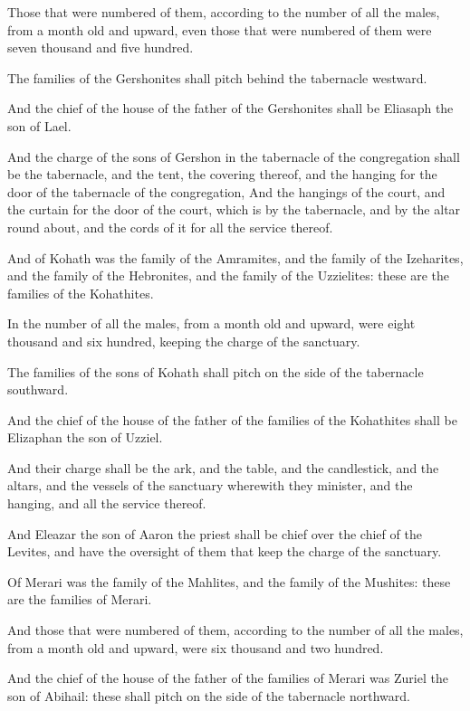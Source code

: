 \verse Those that were numbered of them, according to the number of all
the males, from a month old and upward, even those that were numbered
of them were seven thousand and five hundred.

\verse The families of the Gershonites shall pitch behind the tabernacle
westward.

\verse And the chief of the house of the father of the Gershonites shall
be Eliasaph the son of Lael.

\verse And the charge of the sons of Gershon in the tabernacle of the
congregation shall be the tabernacle, and the tent, the covering
thereof, and the hanging for the door of the tabernacle of the
congregation, \verse And the hangings of the court, and the curtain for
the door of the court, which is by the tabernacle, and by the altar
round about, and the cords of it for all the service thereof.

\verse And of Kohath was the family of the Amramites, and the family of
the Izeharites, and the family of the Hebronites, and the family of
the Uzzielites: these are the families of the Kohathites.

\verse In the number of all the males, from a month old and upward, were
eight thousand and six hundred, keeping the charge of the sanctuary.

\verse The families of the sons of Kohath shall pitch on the side of the
tabernacle southward.

\verse And the chief of the house of the father of the families of the
Kohathites shall be Elizaphan the son of Uzziel.

\verse And their charge shall be the ark, and the table, and the
candlestick, and the altars, and the vessels of the sanctuary
wherewith they minister, and the hanging, and all the service thereof.

\verse And Eleazar the son of Aaron the priest shall be chief over the
chief of the Levites, and have the oversight of them that keep the
charge of the sanctuary.

\verse Of Merari was the family of the Mahlites, and the family of the
Mushites: these are the families of Merari.

\verse And those that were numbered of them, according to the number of
all the males, from a month old and upward, were six thousand and two
hundred.

\verse And the chief of the house of the father of the families of
Merari was Zuriel the son of Abihail: these shall pitch on the side of
the tabernacle northward.

